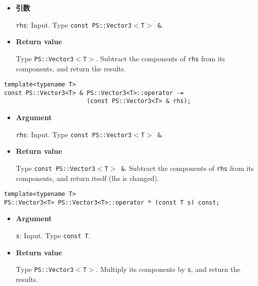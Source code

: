 \begin{itemize}

\item{{\bf 引数}}

\texttt{rhs}: Input. Type \texttt{const PS::Vector3$<$T$>$ \&}.

\item{{\bf Return value}}

Type \texttt{PS::Vector3$<$T$>$}. Subtract the components of \texttt{rhs} from its
components, and return the results.

\end{itemize}


\begin{screen}
\begin{verbatim}
template<typename T>
const PS::Vector3<T> & PS::Vector3<T>::operator -= 
                       (const PS::Vector3<T> & rhs);
\end{verbatim}
\end{screen}

\begin{itemize}

\item{{\bf Argument}}

\texttt{rhs}: Input. Type \texttt{const PS::Vector3$<$T$>$ \&}.

\item{{\bf Return value}}

Type \texttt{const PS::Vector3$<$T$>$ \&}. Subtract the components of \texttt{rhs} from
its components, and return itself (lhs is changed).

\end{itemize}

\mbox{}

\begin{screen}
\begin{verbatim}
template<typename T>
PS::Vector3<T> PS::Vector3<T>::operator * (const T s) const;
\end{verbatim}
\end{screen}

\begin{itemize}

\item{{\bf Argument}}

\texttt{s}: Input. Type \texttt{const T}.

\item{{\bf Return value}}

Type \texttt{PS::Vector3$<$T$>$}. Multiply its components by \texttt{s}, and return
the results.

\end{itemize}


